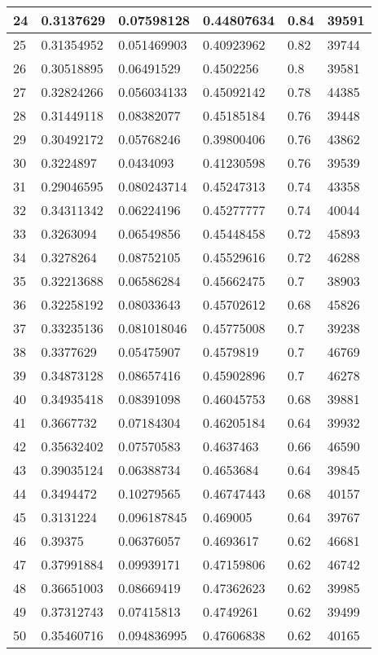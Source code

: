 \begin{longtable}{|l|l|l|l|l|l|}
24 & 0.3137629 & 0.07598128 & 0.44807634 & 0.84 & 39591 \\ \hline 
25 & 0.31354952 & 0.051469903 & 0.40923962 & 0.82 & 39744 \\ \hline 
26 & 0.30518895 & 0.06491529 & 0.4502256 & 0.8 & 39581 \\ \hline 
27 & 0.32824266 & 0.056034133 & 0.45092142 & 0.78 & 44385 \\ \hline 
28 & 0.31449118 & 0.08382077 & 0.45185184 & 0.76 & 39448 \\ \hline 
29 & 0.30492172 & 0.05768246 & 0.39800406 & 0.76 & 43862 \\ \hline 
30 & 0.3224897 & 0.0434093 & 0.41230598 & 0.76 & 39539 \\ \hline 
31 & 0.29046595 & 0.080243714 & 0.45247313 & 0.74 & 43358 \\ \hline 
32 & 0.34311342 & 0.06224196 & 0.45277777 & 0.74 & 40044 \\ \hline 
33 & 0.3263094 & 0.06549856 & 0.45448458 & 0.72 & 45893 \\ \hline 
34 & 0.3278264 & 0.08752105 & 0.45529616 & 0.72 & 46288 \\ \hline 
35 & 0.32213688 & 0.06586284 & 0.45662475 & 0.7 & 38903 \\ \hline 
36 & 0.32258192 & 0.08033643 & 0.45702612 & 0.68 & 45826 \\ \hline 
37 & 0.33235136 & 0.081018046 & 0.45775008 & 0.7 & 39238 \\ \hline 
38 & 0.3377629 & 0.05475907 & 0.4579819 & 0.7 & 46769 \\ \hline 
39 & 0.34873128 & 0.08657416 & 0.45902896 & 0.7 & 46278 \\ \hline 
40 & 0.34935418 & 0.08391098 & 0.46045753 & 0.68 & 39881 \\ \hline 
41 & 0.3667732 & 0.07184304 & 0.46205184 & 0.64 & 39932 \\ \hline 
42 & 0.35632402 & 0.07570583 & 0.4637463 & 0.66 & 46590 \\ \hline 
43 & 0.39035124 & 0.06388734 & 0.4653684 & 0.64 & 39845 \\ \hline 
44 & 0.3494472 & 0.10279565 & 0.46747443 & 0.68 & 40157 \\ \hline 
45 & 0.3131224 & 0.096187845 & 0.469005 & 0.64 & 39767 \\ \hline 
46 & 0.39375 & 0.06376057 & 0.4693617 & 0.62 & 46681 \\ \hline 
47 & 0.37991884 & 0.09939171 & 0.47159806 & 0.62 & 46742 \\ \hline 
48 & 0.36651003 & 0.08669419 & 0.47362623 & 0.62 & 39985 \\ \hline 
49 & 0.37312743 & 0.07415813 & 0.4749261 & 0.62 & 39499 \\ \hline 
50 & 0.35460716 & 0.094836995 & 0.47606838 & 0.62 & 40165 \\ \hline 
\end{longtable}